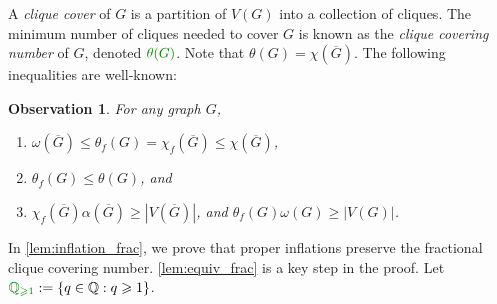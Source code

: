 \documentclass[11pt]{article}
\numberwithin{equation}{section}
\theoremstyle{plain}
\newtheorem{obs}[equation]{Observation}
\theoremstyle{definition}
\renewcommand{\geq}{\geqslant}
\renewcommand{\leq}{\leqslant}
\newcommand{\Q}{\mathbb{Q}}
\newcommand{\defn}[1]{\textcolor{green!50!black}{\textit{#1}}}
\newcommand{\mathdefn}[1]{\textcolor{green!50!black}{#1}}
\begin{document}
A \defn{clique cover} of $G$ is a partition of $V(G)$ into a collection of cliques. The minimum number of cliques needed to cover $G$ is known as the \defn{clique covering number} of $G$, denoted $\mathdefn{\theta(G)}$. Note that $\theta(G) = \chi(\overline{G})$. The following inequalities are well-known:
\begin{obs}
    \label{obs:fractional}
    For any graph $G$,
    \begin{enumerate}
        \item $\omega(\overline{G}) \leq \theta_f(G) = \chi_f(\overline{G}) \leq \chi(\overline{G})$,
        \item $\theta_f(G) \leq \theta(G)$, and
        \item $\chi_f(\overline{G}) \alpha(\overline{G}) \geq |V(\overline{G})|$, and $\theta_f(G) \omega(G) \geq |V(G)|$.
    \end{enumerate}
\end{obs}
In \cref{lem:inflation_frac}, we prove that proper inflations preserve the fractional clique covering number. \cref{lem:equiv_frac} is a key step in the proof. Let $\mathdefn{\Q_{\geq 1}}:=\{q \in \Q: q \geq 1\}$.
\end{document}
